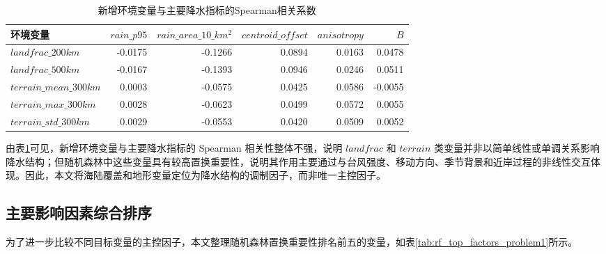 \documentclass[UTF8,a4paper,zihao=5,fontset=fandol]{ctexart}
\numberwithin{equation}{section}
\numberwithin{figure}{section}
\numberwithin{table}{section}
\begin{document}
\begin{table}[htbp]
    \centering
    \caption{新增环境变量与主要降水指标的Spearman相关系数}
    \label{tab:env_spearman_problem1}
    \small
    \begin{tabular}{lrrrrr}
        \hline
        环境变量 & $rain\_p95$ & $rain\_area\_10\_km^2$ & $centroid\_offset$ & $anisotropy$ & $B$ \\
        \hline
        $landfrac\_200km$ & -0.0175 & -0.1266 & 0.0894 & 0.0163 & 0.0478 \\
        $landfrac\_500km$ & -0.0167 & -0.1393 & 0.0946 & 0.0246 & 0.0511 \\
        $terrain\_mean\_300km$ & 0.0003 & -0.0575 & 0.0425 & 0.0586 & -0.0055 \\
        $terrain\_max\_300km$ & 0.0028 & -0.0623 & 0.0499 & 0.0572 & 0.0055 \\
        $terrain\_std\_300km$ & 0.0029 & -0.0553 & 0.0420 & 0.0509 & 0.0052 \\
        \hline
    \end{tabular}
\end{table}

由表\ref{tab:env_spearman_problem1}可见，新增环境变量与主要降水指标的 Spearman 相关性整体不强，说明 $landfrac$ 和 $terrain$ 类变量并非以简单线性或单调关系影响降水结构；但随机森林中这些变量具有较高置换重要性，说明其作用主要通过与台风强度、移动方向、季节背景和近岸过程的非线性交互体现。因此，本文将海陆覆盖和地形变量定位为降水结构的调制因子，而非唯一主控因子。

\subsection{主要影响因素综合排序}

为了进一步比较不同目标变量的主控因子，本文整理随机森林置换重要性排名前五的变量，如表\ref{tab:rf_top_factors_problem1}所示。
\end{document}
